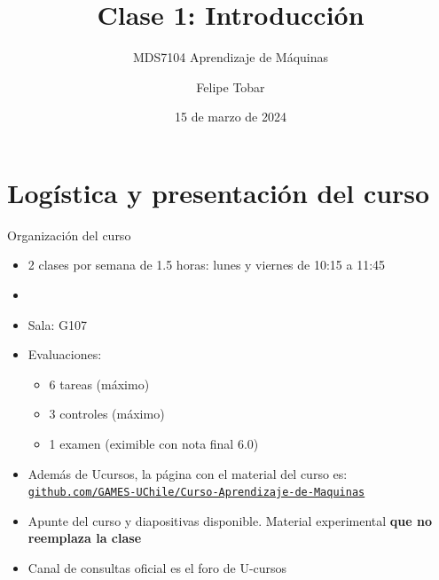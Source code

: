 \documentclass[9pt]{beamer}
\title{Clase 1: Introducción}
\subtitle{MDS7104 Aprendizaje de Máquinas}
\date{15 de marzo de 2024}
\author{Felipe Tobar}
\institute{Iniciativa de Datos e Inteligencia Artificial\\Universidad de Chile}
\begin{document}
\begin{frame}
  \titlepage
\end{frame}

\section{Logística y presentación del curso}
\begin{frame}{Organización del curso}

\begin{itemize}
  \item 2 clases por semana de 1.5 horas: lunes y viernes de 10:15 a 11:45 
  \item {} 
  \item Sala: G107
  \item Evaluaciones: 
  \begin{itemize}
    \item 6 tareas (máximo)
    \item 3 controles (máximo) 
    \item 1 examen (eximible con nota final 6.0)
  \end{itemize}
  \item Además de Ucursos, la página con el material del curso es: \href{https://github.com/GAMES-UChile/Curso-Aprendizaje-de-Maquinas}{\tt github.com/GAMES-UChile/Curso-Aprendizaje-de-Maquinas}
  \item Apunte del curso y diapositivas disponible. Material experimental \textbf{que no reemplaza la clase}
  \item Canal de consultas oficial es el foro de U-cursos
\end{itemize}

\end{frame}
\end{document}

